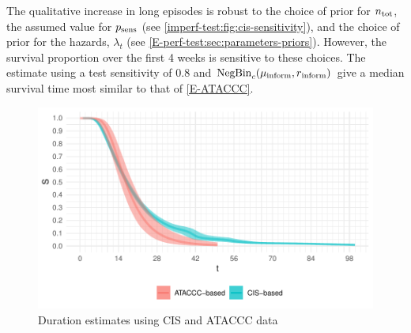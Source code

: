\documentclass[thesis.tex]{subfiles}
\begin{document}
The qualitative increase in long episodes is robust to the choice of prior for $n_\text{tot}$, the assumed value for $p_\text{sens}$ (see \cref{imperf-test:fig:cis-sensitivity}), and the choice of prior for the hazards, $\lambda_t$ (see \cref{E-perf-test:sec:parameters-priors}).
However, the survival proportion over the first 4 weeks is sensitive to these choices.
The estimate using a test sensitivity of 0.8 and $\operatorname{NegBin}_{c}(\mu{_{\text{inform}}}, r{_{\text{inform}}})$ give a median survival time most similar to that of \cref{E-ATACCC}.
\begin{figure}
  \centering \includegraphics{cis-imperfect-testing/CIS_final}
  \caption{Duration estimates using CIS and ATACCC data}
  \label{imperf-test:fig:cis-estimates}
\end{figure}
\end{document}
